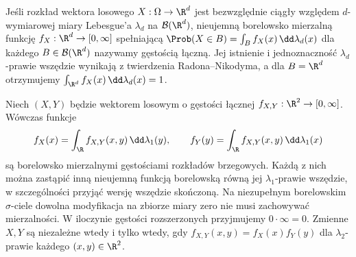 \begin{definicja}
Jeśli rozkład wektora losowego $X:\Omega\to\R^d$ jest bezwzględnie
ciągły względem $d$-wymiarowej miary Lebesgue'a $\lambda_d$
na $\mathcal B(\R^d)$, nieujemną borelowsko mierzalną funkcję
$f_X:\R^d\to[0,\infty]$ spełniającą
$\Prob(X\in B)=\int_B f_X(x)\,\dd\lambda_d(x)$ dla każdego
$B\in\mathcal B(\R^d)$ nazywamy gęstością łączną.
Jej istnienie i jednoznaczność $\lambda_d$-prawie wszędzie
wynikają z twierdzenia Radona--Nikodyma, a dla $B=\R^d$
otrzymujemy $\int_{\R^d}f_X(x)\,\dd\lambda_d(x)=1$.
\end{definicja}

\begin{twierdzenie}
Niech $(X,Y)$ będzie wektorem losowym o gęstości łącznej
$f_{X,Y}:\R^2\to[0,\infty]$. Wówczas funkcje
\[
f_X(x)=\int_\R f_{X,Y}(x,y)\,\dd\lambda_1(y),\qquad
f_Y(y)=\int_\R f_{X,Y}(x,y)\,\dd\lambda_1(x)
\]
są borelowsko mierzalnymi gęstościami rozkładów brzegowych.
Każdą z nich można zastąpić inną nieujemną funkcją
borelowską równą jej $\lambda_1$-prawie wszędzie,
w szczególności przyjąć wersję wszędzie skończoną.
Na niezupełnym borelowskim $\sigma$-ciele dowolna
modyfikacja na zbiorze miary zero nie musi zachowywać
mierzalności.
W iloczynie gęstości rozszerzonych przyjmujemy $0\cdot\infty=0$. Zmienne $X,Y$ są niezależne wtedy i tylko wtedy,
gdy $f_{X,Y}(x,y)=f_X(x)f_Y(y)$ dla $\lambda_2$-prawie każdego
$(x,y)\in\R^2$.
\end{twierdzenie}
